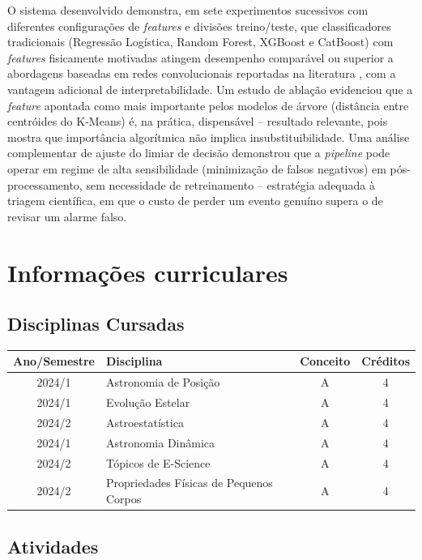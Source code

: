 \documentclass[12pt]{article}
\numberwithin{equation}{section}
\begin{document}
O sistema desenvolvido demonstra, em sete experimentos sucessivos com diferentes configurações de \textit{features} e divisões treino/teste, que classificadores tradicionais (Regressão Logística, Random Forest, XGBoost e CatBoost) com \textit{features} fisicamente motivadas atingem desempenho comparável ou superior a abordagens baseadas em redes convolucionais reportadas na literatura \citep{Cazeneuve_2023}, com a vantagem adicional de interpretabilidade. Um estudo de ablação evidenciou que a \textit{feature} apontada como mais importante pelos modelos de árvore (distância entre centróides do K-Means) é, na prática, dispensável -- resultado relevante, pois mostra que importância algorítmica não implica insubstituibilidade. Uma análise complementar de ajuste do limiar de decisão demonstrou que a \textit{pipeline} pode operar em regime de alta sensibilidade (minimização de falsos negativos) em pós-processamento, sem necessidade de retreinamento -- estratégia adequada à triagem científica, em que o custo de perder um evento genuíno supera o de revisar um alarme falso.

\section{\sc Informações curriculares}

\subsection{Disciplinas Cursadas}

{\small
\begin{tabular}{|c|l|c|c|}
\hline
Ano/Semestre & Disciplina & Conceito & Créditos \\
\hline
2024/1       & Astronomia de Posição    & A & 4  \\
2024/1       & Evolução Estelar	& A & 4  \\
2024/2       & Astroestatística         & A & 4  \\
2024/1       & Astronomia Dinâmica      & A & 4  \\
2024/2       & Tópicos de E-Science     & A & 4  \\
2024/2       & Propriedades Físicas de Pequenos Corpos & A & 4 \\
\hline
\hline
\end{tabular}
}

\subsection{Atividades}
\end{document}
